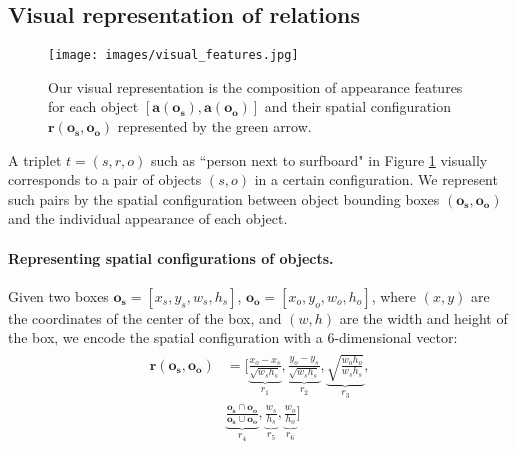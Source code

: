 \documentclass[10pt,twocolumn,letterpaper]{article}
\newcommand{\spaceparagraph}{\vspace{-.35cm}}
\begin{document}
\subsection{Visual representation of relations}
\label{visual_representation}


\begin{figure}[t]
	\begin{center}
   	\texttt{[image: images/visual\_features.jpg]}
	\end{center}
	\setlength\abovecaptionskip{-5pt}
   	\caption{Our visual representation is the composition of appearance features for each object $[\bm{a}(\bm{o_s}), \bm{a}(\bm{o_o})]$ and their spatial configuration $\bm{r}(\bm{o_s},\bm{o_o})$ represented by the green arrow.}
   	\vspace{-.4cm}
	\label{fig:visual_representation}
\end{figure}


A triplet $t=(s,r,o)$ such as ``person next to surfboard" in Figure \ref{fig:visual_representation} visually corresponds to a pair of objects $(s,o)$ in a certain configuration. We represent such pairs by the spatial configuration between object bounding boxes $(\bm{o_s},\bm{o_o})$ and the individual appearance of each object. 


\spaceparagraph
\paragraph{Representing spatial configurations of objects.} Given two boxes $\bm{o_s} = [x_{s}, y_{s}, w_s, h_s]$, $\bm{o_o} = [x_{o}, y_{o}, w_o, h_o]$, where $(x, y)$ are the coordinates of the center of the box, and $(w,h)$ are the width and height of the box, we encode the spatial configuration with a 6-dimensional vector:
\vspace{-2pt}
\begin{align}
\label{eq:spatial}
\begin{split}
\bm{r}(\bm{o_s},\bm{o_o})& = [\underbrace{\frac{x_{o}-x_{s}}{\sqrt{w_s h_s}}}_{r_1}, \underbrace{\frac{y_{o}-y_{s}}{\sqrt{w_s h_s}}}_{r_2}, \underbrace{\sqrt{\frac{w_o h_o}{w_s h_s}}}_{r_3}, \\
&\underbrace{\frac{\bm{o_s} \cap \bm{o_o}}{\bm{o_s} \cup \bm{o_o}}}_{r_4}, \underbrace{\frac{w_s}{h_s}}_{r_5}, \underbrace{\frac{w_o}{h_o}}_{r_6}]
\end{split}
\end{align}
 
\end{document}
